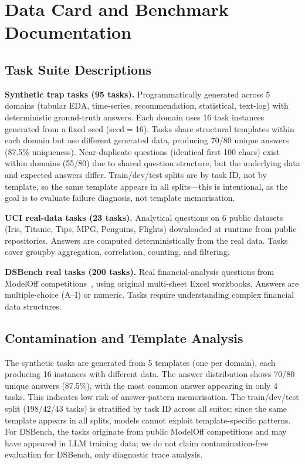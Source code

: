 \section{Data Card and Benchmark Documentation}
\label{app:datacard}

\subsection{Task Suite Descriptions}

\textbf{Synthetic trap tasks (95 tasks).} Programmatically generated across 5 domains (tabular EDA, time-series, recommendation, statistical, text-log) with deterministic ground-truth answers. Each domain uses 16 task instances generated from a fixed seed (seed$=$16). Tasks share structural templates within each domain but use different generated data, producing 70/80 unique answers (87.5\% uniqueness). Near-duplicate questions (identical first 100 chars) exist within domains (55/80) due to shared question structure, but the underlying data and expected answers differ. Train/dev/test splits are by task ID, not by template, so the same template appears in all splits---this is intentional, as the goal is to evaluate failure diagnosis, not template memorisation.

\textbf{UCI real-data tasks (23 tasks).} Analytical questions on 6 public datasets (Iris, Titanic, Tips, MPG, Penguins, Flights) downloaded at runtime from public repositories. Answers are computed deterministically from the real data. Tasks cover groupby aggregation, correlation, counting, and filtering.

\textbf{DSBench real tasks (200 tasks).} Real financial-analysis questions from ModelOff competitions~\citep{jing2024dsbench}, using original multi-sheet Excel workbooks. Answers are multiple-choice (A--I) or numeric. Tasks require understanding complex financial data structures.

\subsection{Contamination and Template Analysis}
\label{app:contamination}

The synthetic tasks are generated from 5 templates (one per domain), each producing 16 instances with different data. The answer distribution shows 70/80 unique answers (87.5\%), with the most common answer appearing in only 4 tasks. This indicates low risk of answer-pattern memorisation. The train/dev/test split (198/42/43 tasks) is stratified by task ID across all suites; since the same template appears in all splits, models cannot exploit template-specific patterns. For DSBench, the tasks originate from public ModelOff competitions and may have appeared in LLM training data; we do not claim contamination-free evaluation for DSBench, only diagnostic trace analysis.

